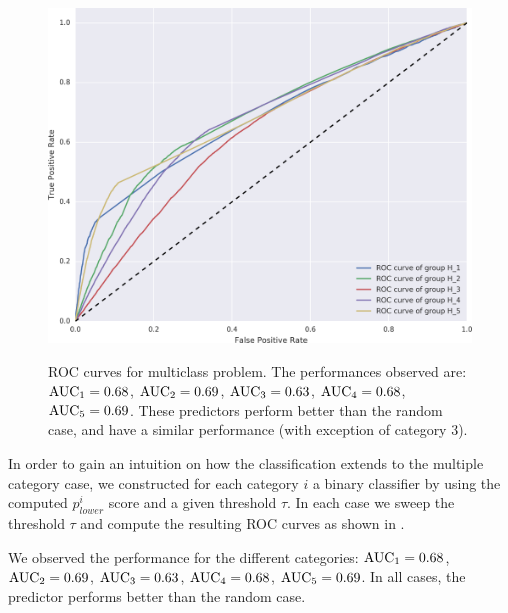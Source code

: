 \begin{figure}[h]
\centering
{\includegraphics[width=0.9\columnwidth]
{figures/ROC_multiclass/ROC_multiclass.png}}
\caption{ROC curves for multiclass problem. The performances observed are: $\operatorname{AUC}_1 = 0.68$, $\operatorname{AUC}_2 = 0.69$, $\operatorname{AUC}_3 = 0.63$, $\operatorname{AUC}_4 = 0.68$, $\operatorname{AUC}_5 = 0.69$. These predictors perform better than the random case, and have a similar performance (with exception of category 3).}
\label{roc_multiple_categories}
\end{figure}

In order to gain an intuition on how the classification extends to the multiple category case, we constructed for each category $i$ a binary classifier by using the computed $p^i_{lower}$ score and a given threshold $\tau$. In each case we sweep the threshold $\tau$ and compute the resulting ROC curves as shown in .

We observed the performance for the different categories: $\operatorname{AUC}_1 = 0.68$, $\operatorname{AUC}_2 = 0.69$, $\operatorname{AUC}_3=0.63$, $\operatorname{AUC}_4 = 0.68$, $\operatorname{AUC}_5 = 0.69$. In all cases, the predictor performs better than the random case.


